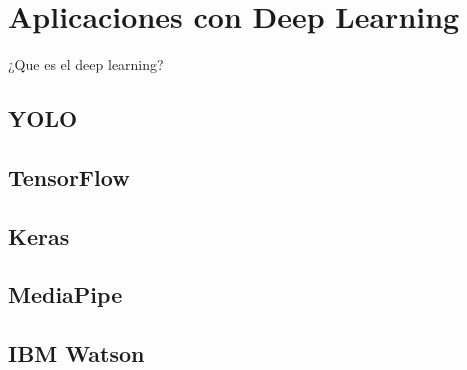 \section{Aplicaciones con Deep Learning}

¿Que es el deep learning?

\subsection*{YOLO}

\subsection*{TensorFlow}

\subsection*{Keras}

\subsection*{MediaPipe}

\subsection*{IBM Watson}


